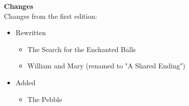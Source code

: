 \huge \textbf{Changes}\\

\large
Changes from the first edition:\\
\begin{itemize}
	\item Rewritten
	\begin{itemize}
		\item The Search for the Enchanted Balls
		\item William and Mary (renamed to "A Shared Ending")
	\end{itemize}
	\item Added
	\begin{itemize}
		\item The Pebble
	\end{itemize}
\end{itemize}